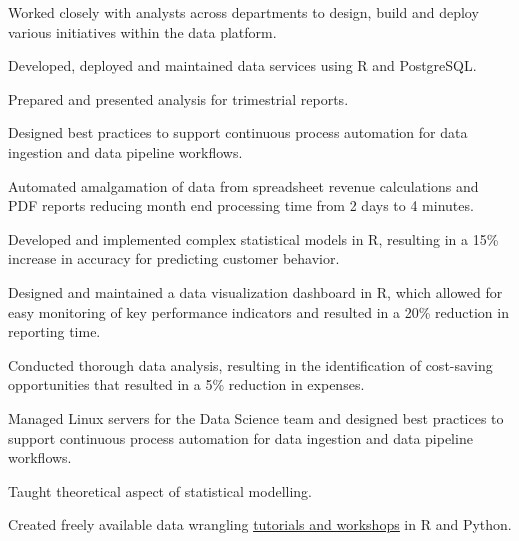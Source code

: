 \documentclass[]{plushcv}
\begin{document}
\begin{minipage}[t]{0.70\textwidth}
\begin{tightemize}
\sectionsep
\item Worked closely with analysts across departments to design, build and deploy various initiatives within the data platform.
\item Developed, deployed and maintained data services using R and PostgreSQL.
\item Prepared and presented analysis for trimestrial reports.
\item Designed best practices to support continuous process automation for data ingestion and data pipeline workflows.
\item Automated amalgamation of data from spreadsheet revenue calculations and PDF reports reducing month end processing time from 2 days to 4 minutes.
\end{tightemize}
\sectionsep




\begin{tightemize}
\sectionsep
\item Developed and implemented complex statistical models in R, resulting in a 15\% increase in accuracy for predicting customer behavior.
\item Designed and maintained a data visualization dashboard in R, which allowed for easy monitoring of key performance indicators and resulted in a 20\% reduction in reporting time.
\item Conducted thorough data analysis, resulting in the identification of cost-saving opportunities that resulted in a 5\% reduction in expenses.
\item Managed Linux servers for the Data Science team and designed best practices to support continuous process automation for data ingestion and data pipeline workflows.

\end{tightemize}
\sectionsep

\begin{tightemize}
\sectionsep
\item Taught theoretical aspect of statistical modelling.
\item Created freely available data wrangling
\href{https://Andres-AM.github.io/Hitchhikers_guide_to_the_brain/}{\underline{tutorials and workshops}} in R and Python.
\end{tightemize}
\sectionsep


\end{minipage}
\end{document}
